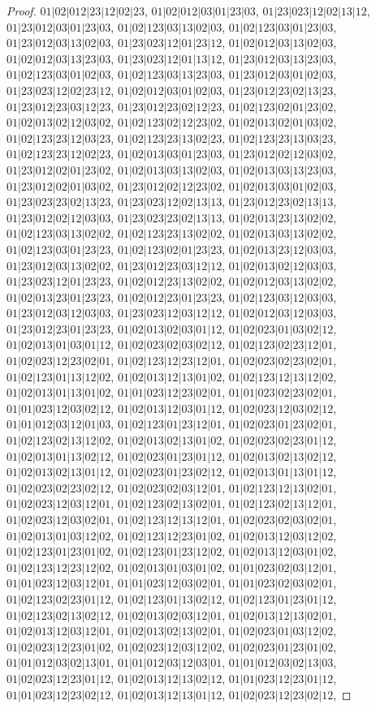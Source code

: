 \documentclass[12pt]{article}
\theoremstyle{plain}
\theoremstyle{definition}
\theoremstyle{remark}
\begin{document}
\begin{proof}
$01|02|012|23|12|02|23$, $01|02|012|03|01|23|03$, $01|23|023|12|02|13|12$, $01|23|012|03|01|23|03$, $01|02|123|03|13|02|03$, $01|02|123|03|01|23|03$, $01|23|012|03|13|02|03$, $01|23|023|12|01|23|12$, $01|02|012|03|13|02|03$, $01|02|012|03|13|23|03$, $01|23|023|12|01|13|12$, $01|23|012|03|13|23|03$, $01|02|123|03|01|02|03$, $01|02|123|03|13|23|03$, $01|23|012|03|01|02|03$, $01|23|023|12|02|23|12$, $01|02|012|03|01|02|03$, $01|23|012|23|02|13|23$, $01|23|012|23|03|12|23$, $01|23|012|23|02|12|23$, $01|02|123|02|01|23|02$, $01|02|013|02|12|03|02$, $01|02|123|02|12|23|02$, $01|02|013|02|01|03|02$, $01|02|123|23|12|03|23$, $01|02|123|23|13|02|23$, $01|02|123|23|13|03|23$, $01|02|123|23|12|02|23$, $01|02|013|03|01|23|03$, $01|23|012|02|12|03|02$, $01|23|012|02|01|23|02$, $01|02|013|03|13|02|03$, $01|02|013|03|13|23|03$, $01|23|012|02|01|03|02$, $01|23|012|02|12|23|02$, $01|02|013|03|01|02|03$, $01|23|023|23|02|13|23$, $01|23|023|12|02|13|13$, $01|23|012|23|02|13|13$, $01|23|012|02|12|03|03$, $01|23|023|23|02|13|13$, $01|02|013|23|13|02|02$, $01|02|123|03|13|02|02$, $01|02|123|23|13|02|02$, $01|02|013|03|13|02|02$, $01|02|123|03|01|23|23$, $01|02|123|02|01|23|23$, $01|02|013|23|12|03|03$, $01|23|012|03|13|02|02$, $01|23|012|23|03|12|12$, $01|02|013|02|12|03|03$, $01|23|023|12|01|23|23$, $01|02|012|23|13|02|02$, $01|02|012|03|13|02|02$, $01|02|013|23|01|23|23$, $01|02|012|23|01|23|23$, $01|02|123|03|12|03|03$, $01|23|012|03|12|03|03$, $01|23|023|12|03|12|12$, $01|02|012|03|12|03|03$, $01|23|012|23|01|23|23$, $01|02|013|02|03|01|12$, $01|02|023|01|03|02|12$, $01|02|013|01|03|01|12$, $01|02|023|02|03|02|12$, $01|02|123|02|23|12|01$, $01|02|023|12|23|02|01$, $01|02|123|12|23|12|01$, $01|02|023|02|23|02|01$, $01|02|123|01|13|12|02$, $01|02|013|12|13|01|02$, $01|02|123|12|13|12|02$, $01|02|013|01|13|01|02$, $01|01|023|12|23|02|01$, $01|01|023|02|23|02|01$, $01|01|023|12|03|02|12$, $01|02|013|12|03|01|12$, $01|02|023|12|03|02|12$, $01|01|012|03|12|01|03$, $01|02|123|01|23|12|01$, $01|02|023|01|23|02|01$, $01|02|123|02|13|12|02$, $01|02|013|02|13|01|02$, $01|02|023|02|23|01|12$, $01|02|013|01|13|02|12$, $01|02|023|01|23|01|12$, $01|02|013|02|13|02|12$, $01|02|013|02|13|01|12$, $01|02|023|01|23|02|12$, $01|02|013|01|13|01|12$, $01|02|023|02|23|02|12$, $01|02|023|02|03|12|01$, $01|02|123|12|13|02|01$, $01|02|023|12|03|12|01$, $01|02|123|02|13|02|01$, $01|02|123|02|13|12|01$, $01|02|023|12|03|02|01$, $01|02|123|12|13|12|01$, $01|02|023|02|03|02|01$, $01|02|013|01|03|12|02$, $01|02|123|12|23|01|02$, $01|02|013|12|03|12|02$, $01|02|123|01|23|01|02$, $01|02|123|01|23|12|02$, $01|02|013|12|03|01|02$, $01|02|123|12|23|12|02$, $01|02|013|01|03|01|02$, $01|01|023|02|03|12|01$, $01|01|023|12|03|12|01$, $01|01|023|12|03|02|01$, $01|01|023|02|03|02|01$, $01|02|123|02|23|01|12$, $01|02|123|01|13|02|12$, $01|02|123|01|23|01|12$, $01|02|123|02|13|02|12$, $01|02|013|02|03|12|01$, $01|02|013|12|13|02|01$, $01|02|013|12|03|12|01$, $01|02|013|02|13|02|01$, $01|02|023|01|03|12|02$, $01|02|023|12|23|01|02$, $01|02|023|12|03|12|02$, $01|02|023|01|23|01|02$, $01|01|012|03|02|13|01$, $01|01|012|03|12|03|01$, $01|01|012|03|02|13|03$, $01|02|023|12|23|01|12$, $01|02|013|12|13|02|12$, $01|01|023|12|23|01|12$, $01|01|023|12|23|02|12$, $01|02|013|12|13|01|12$, $01|02|023|12|23|02|12$, 
\end{proof}
\end{document}
